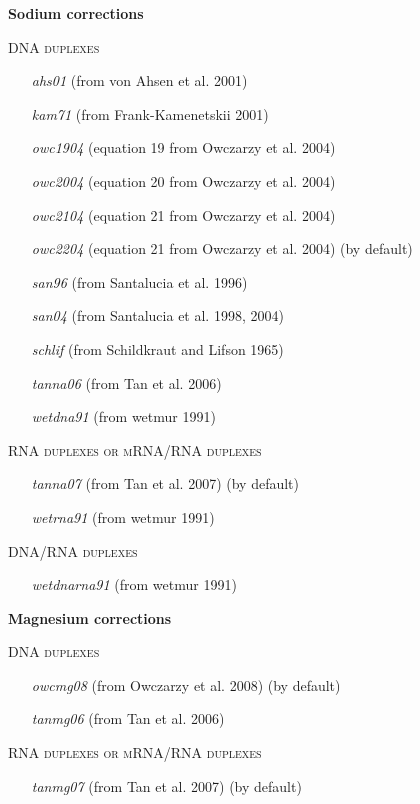 \documentclass{article}
\begin{document}
\begin{description}
    \textbf{Sodium corrections}
    
    \textsc{DNA duplexes}
      \begin{itemize}
      \item [\textit{ahs01}] (from von Ahsen et al. 2001)
      \item [\textit{kam71}] (from Frank-Kamenetskii 2001)
      \item [\textit{owc1904}] (equation 19 from Owczarzy et al. 2004)
      \item [\textit{owc2004}] (equation 20 from Owczarzy et al. 2004)
      \item [\textit{owc2104}] (equation 21 from Owczarzy et al. 2004)
      \item [\textit{owc2204}] (equation 21 from Owczarzy et al. 2004)  (by default)
      \item [\textit{san96}] (from Santalucia et al. 1996)
      \item [\textit{san04}] (from Santalucia et al. 1998, 2004)
      \item [\textit{schlif}] (from Schildkraut and Lifson 1965)
      \item [\textit{tanna06}] (from Tan et al. 2006)
      \item [\textit{wetdna91}] (from wetmur 1991)	 
      \end{itemize}
    \textsc{RNA duplexes or mRNA/RNA duplexes}
      \begin{itemize}
      \item [\textit{tanna07}] (from Tan et al. 2007)  (by default)
      \item [\textit{wetrna91}] (from wetmur 1991)	 
      \end{itemize}
    \textsc{DNA/RNA duplexes}
      \begin{itemize}
      \item [\textit{wetdnarna91}] (from wetmur 1991)	 
      \end{itemize}
  
  \textbf{Magnesium corrections}
  
    \textsc{DNA duplexes}
      \begin{itemize}
      \item [\textit{owcmg08}] (from Owczarzy et al. 2008)  (by default)
      \item [\textit{tanmg06}] (from Tan et al. 2006)	  
      \end{itemize}
    \textsc{RNA duplexes or mRNA/RNA duplexes}
      \begin{itemize}
      \item [\textit{tanmg07}] (from Tan et al. 2007)  (by default)
      \end{itemize}
    

\end{description}
\end{document}
